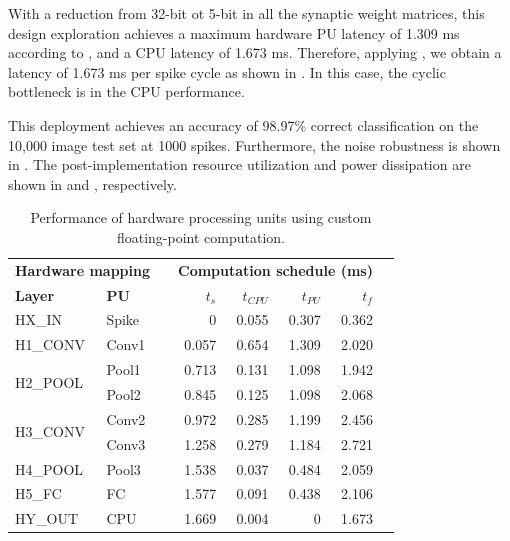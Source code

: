 With a reduction from 32-bit ot 5-bit in all the synaptic weight matrices, this design exploration achieves a maximum hardware PU latency of 1.309 ms according to , and a CPU latency of 1.673 ms. Therefore, applying , we obtain a latency of 1.673 ms per spike cycle as shown in . In this case, the cyclic bottleneck is in the CPU performance.

This deployment achieves an accuracy of 98.97\% correct classification on the 10,000 image test set at 1000 spikes. Furthermore, the noise robustness is shown in . The post-implementation resource utilization and power dissipation are shown in  and , respectively.

\begin{table}[t!]\centering
	\caption{Performance of hardware processing units using custom floating-point computation.}\label{tab:latency_cfp}
	\scriptsize
	\begin{tabular}{llrrrrrr}\toprule
		\multicolumn{2}{c}{\textbf{Hardware mapping}} & &\multicolumn{4}{c}{\textbf{Computation schedule (ms)}} \\\cmidrule{1-2}\cmidrule{4-7}
		\textbf{Layer} &\textbf{PU} & &$t_s$ &$t_{CPU}$ &$t_{PU}$ &$t_f$ \\\midrule
		HX\_IN &Spike & &0 &0.055 &0.307 &0.362 \\
		H1\_CONV &Conv1 & &0.057 &0.654 &1.309 &2.020 \\
		\multirow{2}{*}{H2\_POOL} &Pool1 & &0.713 &0.131 &1.098 &1.942 \\
		&Pool2 & &0.845 &0.125 &1.098 &2.068 \\
		\multirow{2}{*}{H3\_CONV} &Conv2 & &0.972 &0.285 &1.199 &2.456 \\
		&Conv3 & &1.258 &0.279 &1.184 &2.721 \\
		H4\_POOL &Pool3 & &1.538 &0.037 &0.484 &2.059 \\
		H5\_FC &FC & &1.577 &0.091 &0.438 &2.106 \\
		HY\_OUT &CPU & &1.669 &0.004 &0 &1.673 \\
		\bottomrule
	\end{tabular}
\end{table}


